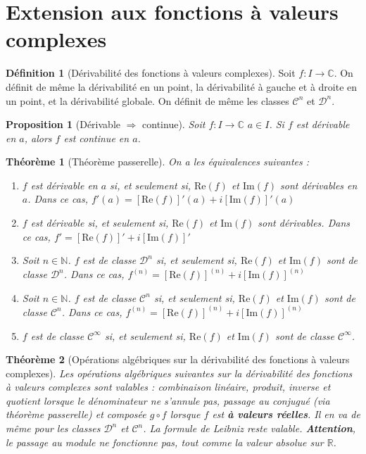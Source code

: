 \documentclass[french]{book}
\newcommand{\N}{\mathbb{N}}
\newcommand{\R}{\mathbb{R}}
\newcommand{\C}{\mathbb{C}}
\theoremstyle{plain}
\newtheorem{thm}{Théorème}[chapter]
\newtheorem{prop}{Proposition}[chapter]
\theoremstyle{definition}
\newtheorem{dfn}{Définition}[chapter]
\theoremstyle{remark}
\begin{document}
\section{Extension aux fonctions à valeurs complexes}
\begin{dfn}[Dérivabilité des fonctions à valeurs complexes]
	Soit $f:I\rightarrow\C$. On définit de même la dérivabilité en un point, la dérivabilité à gauche et à droite en un point, et la dérivabilité globale. On définit de même les classes $\mathcal{C}^n$ et $\mathcal{D}^n$.
\end{dfn}
\begin{prop}[Dérivable $\Rightarrow$ continue]
	Soit $f:I\rightarrow\C$ $a\in I$. Si $f$ est dérivable en $a$, alors $f$ est continue en $a$.
\end{prop}
\begin{thm}[Théorème passerelle]
	On a les équivalences suivantes :
	\begin{enumerate}
		\item $f$ est dérivable en $a$ si, et seulement si, $\text{Re}(f)$ et $\text{Im}(f)$ sont dérivables en $a$. Dans ce cas, $f'(a)=[\text{Re}(f)]'(a)+i[\text{Im}(f)]'(a)$
		\item $f$ est dérivable si, et seulement si, $\text{Re}(f)$ et $\text{Im}(f)$ sont dérivables. Dans ce cas, $f'=[\text{Re}(f)]'+i[\text{Im}(f)]'$
		\item Soit $n\in\N$. $f$ est de classe $\mathcal{D}^n$ si, et seulement si, $\text{Re}(f)$ et $\text{Im}(f)$ sont de classe $\mathcal{D}^n$. Dans ce cas, $f^{(n)}=[\text{Re}(f)]^{(n)}+i[\text{Im}(f)]^{(n)}$
		\item Soit $n\in\N$. $f$ est de classe $\mathcal{C}^n$ si, et seulement si, $\text{Re}(f)$ et $\text{Im}(f)$ sont de classe $\mathcal{C}^n$. Dans ce cas, $f^{(n)}=[\text{Re}(f)]^{(n)}+i[\text{Im}(f)]^{(n)}$
		\item $f$ est de classe $\mathcal{C}^\infty$ si, et seulement si, $\text{Re}(f)$ et $\text{Im}(f)$ sont de classe $\mathcal{C}^\infty$.
	\end{enumerate}
\end{thm}
\begin{thm}[Opérations algébriques sur la dérivabilité des fonctions à valeurs complexes]
	Les opérations algébriques suivantes sur la dérivabilité des fonctions à valeurs complexes sont valables : combinaison linéaire, produit, inverse et quotient lorsque le dénominateur ne s'annule pas, passage au conjugué (via théorème passerelle) et composée $g\circ f$ lorsque $f$ est \textbf{à valeurs réelles}. Il en va de même pour les classes $\mathcal{D}^n$ et $\mathcal{C}^n$. La formule de Leibniz reste valable. \textbf{Attention}, le passage au module ne fonctionne pas, tout comme la valeur absolue sur $\R$.
\end{thm}
\end{document}
